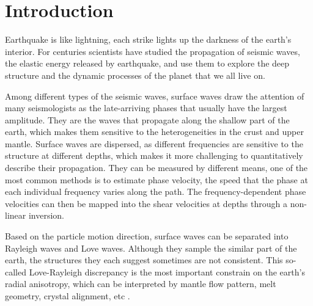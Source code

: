 \documentclass[12pt,oneside]{book}
\begin{document}


\mainmatter


\singlespacing
\chapter{Introduction}
\label{ch:intro}
\doublespacing

\pagestyle{fancy}
\chead{}
\cfoot{\thepage}
\renewcommand{\headrulewidth}{0pt} %
\thispagestyle{fancy}

Earthquake is like lightning, each strike lights up the darkness of the earth's interior. For centuries scientists have studied the propagation of seismic waves, the elastic energy released by earthquake, and use them to explore the deep structure and the dynamic processes of the planet that we all live on. 

Among different types of the seismic waves, surface waves draw the attention of many seismologists as the late-arriving phases that usually have the largest amplitude. They are the waves that propagate along the shallow part of the earth, which makes them sensitive to the heterogeneities in the crust and upper mantle.
Surface waves are dispersed, as different frequencies are sensitive to the structure at different depths, which makes it more challenging to quantitatively describe their propagation. 
They can be measured by different means, one of the most common methods is to estimate phase velocity, the speed that the phase at each individual frequency varies along the path. 
The frequency-dependent phase velocities can then be mapped into the shear velocities at depths through a non-linear inversion.

Based on the particle motion direction, surface waves can be separated into Rayleigh waves and Love waves. Although they sample the similar part of the earth, the structures they each suggest sometimes are not consistent. This so-called Love-Rayleigh discrepancy is the most important constrain on the earth's radial anisotropy, which can be interpreted by mantle flow pattern, melt geometry, crystal alignment, etc \citep[e.g.][]{Gaherty:2004is,Gaherty:2007cc,Holtzman:2010fta}.
\end{document}
